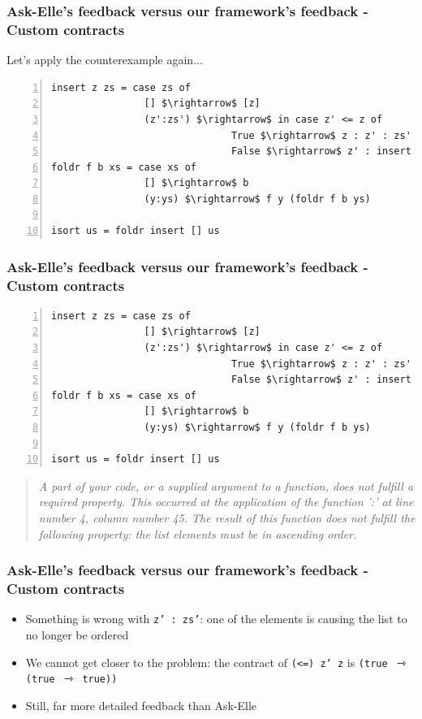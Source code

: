 \documentclass[]{beamer}
\begin{document}
\begin{frame}[fragile]
\frametitle{Ask-Elle's feedback versus our framework's feedback - Custom contracts}

Let's apply the counterexample again...

\begin{lstlisting}[mathescape,numbers=left]
insert z zs = case zs of
                [] $\rightarrow$ [z]
                (z':zs') $\rightarrow$ in case z' <= z of
                               True $\rightarrow$ z : z' : zs'
                               False $\rightarrow$ z' : insert z zs'
foldr f b xs = case xs of
                [] $\rightarrow$ b
                (y:ys) $\rightarrow$ f y (foldr f b ys)
                
isort us = foldr insert [] us
\end{lstlisting}

\end{frame}

\begin{frame}[fragile]
\frametitle{Ask-Elle's feedback versus our framework's feedback - Custom contracts}

\begin{lstlisting}[mathescape,numbers=left]
insert z zs = case zs of
                [] $\rightarrow$ [z]
                (z':zs') $\rightarrow$ in case z' <= z of
                               True $\rightarrow$ z : z' : zs'
                               False $\rightarrow$ z' : insert z zs'
foldr f b xs = case xs of
                [] $\rightarrow$ b
                (y:ys) $\rightarrow$ f y (foldr f b ys)
                
isort us = foldr insert [] us
\end{lstlisting}

\begin{quote}
\textit{A part of your code, or a supplied argument to a function, does not fulfill a required property. This occurred at the application of the function ':' at line number 4, column number 45. The result of this function does not fulfill the following property: the list elements must be in ascending order.}
\end{quote}

\end{frame}

\begin{frame}[fragile]
\frametitle{Ask-Elle's feedback versus our framework's feedback - Custom contracts}

\begin{itemize}
	\item Something is wrong with \texttt{z' : zs'}: one of the elements is causing the list to no longer be ordered
	\item We cannot get closer to the problem: the contract of \texttt{(<=) z' z} is \texttt{(true $\rightarrowtriangle$ (true $\rightarrowtriangle$ true))}
	\item Still, far more detailed feedback than Ask-Elle
\end{itemize}

\end{frame}
\end{document}

